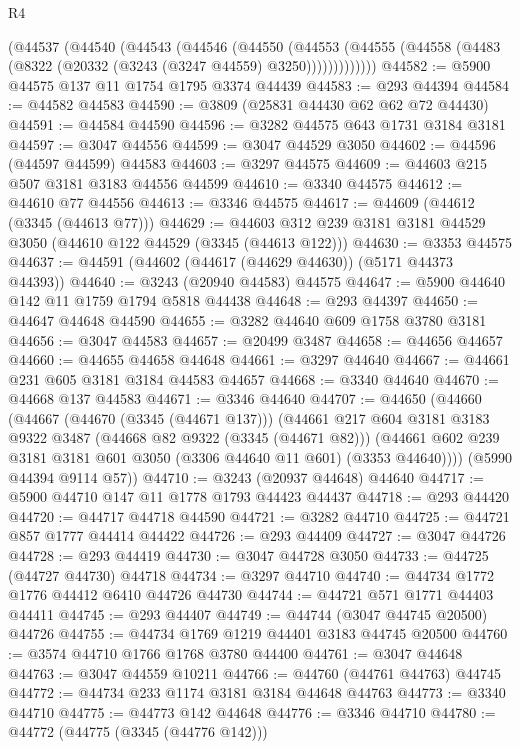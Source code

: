 \begin{lexlean}{R4}
\begin{coremodule}
      (@44537
        (@44540
          (@44543
            (@44546
              (@44550
                (@44553
                  (@44555 (@44558 (@4483 (@8322 (@20332 (@3243 (@3247 @44559) @3250)))))))))))))
@44582 := @5900 @44575 @137 @11 @1754 @1795 @3374 @44439
@44583 := @293 @44394
@44584 := @44582 @44583
@44590 := @3809 (@25831 @44430 @62 @62 @72 @44430)
@44591 := @44584 @44590
@44596 := @3282 @44575 @643 @1731 @3184 @3181
@44597 := @3047 @44556
@44599 := @3047 @44529 @3050
@44602 := @44596 (@44597 @44599) @44583
@44603 := @3297 @44575
@44609 := @44603 @215 @507 @3181 @3183 @44556 @44599
@44610 := @3340 @44575
@44612 := @44610 @77 @44556
@44613 := @3346 @44575
@44617 := @44609 (@44612 (@3345 (@44613 @77)))
@44629 := @44603 @312 @239 @3181 @3181 @44529 @3050 (@44610 @122 @44529 (@3345 (@44613 @122)))
@44630 := @3353 @44575
@44637 := @44591 (@44602 (@44617 (@44629 @44630)) (@5171 @44373 @44393))
@44640 := @3243 (@20940 @44583) @44575
@44647 := @5900 @44640 @142 @11 @1759 @1794 @5818 @44438
@44648 := @293 @44397
@44650 := @44647 @44648 @44590
@44655 := @3282 @44640 @609 @1758 @3780 @3181
@44656 := @3047 @44583
@44657 := @20499 @3487
@44658 := @44656 @44657
@44660 := @44655 @44658 @44648
@44661 := @3297 @44640
@44667 := @44661 @231 @605 @3181 @3184 @44583 @44657
@44668 := @3340 @44640
@44670 := @44668 @137 @44583
@44671 := @3346 @44640
@44707 := @44650
    (@44660
      (@44667
        (@44670 (@3345 (@44671 @137)))
        (@44661
          @217
          @604
          @3181
          @3183
          @9322
          @3487
          (@44668 @82 @9322 (@3345 (@44671 @82)))
          (@44661 @602 @239 @3181 @3181 @601 @3050 (@3306 @44640 @11 @601) (@3353 @44640))))
      (@5990 @44394 @9114 @57))
@44710 := @3243 (@20937 @44648) @44640
@44717 := @5900 @44710 @147 @11 @1778 @1793 @44423 @44437
@44718 := @293 @44420
@44720 := @44717 @44718 @44590
@44721 := @3282 @44710
@44725 := @44721 @857 @1777 @44414 @44422
@44726 := @293 @44409
@44727 := @3047 @44726
@44728 := @293 @44419
@44730 := @3047 @44728 @3050
@44733 := @44725 (@44727 @44730) @44718
@44734 := @3297 @44710
@44740 := @44734 @1772 @1776 @44412 @6410 @44726 @44730
@44744 := @44721 @571 @1771 @44403 @44411
@44745 := @293 @44407
@44749 := @44744 (@3047 @44745 @20500) @44726
@44755 := @44734 @1769 @1219 @44401 @3183 @44745 @20500
@44760 := @3574 @44710 @1766 @1768 @3780 @44400
@44761 := @3047 @44648
@44763 := @3047 @44559 @10211
@44766 := @44760 (@44761 @44763) @44745
@44772 := @44734 @233 @1174 @3181 @3184 @44648 @44763
@44773 := @3340 @44710
@44775 := @44773 @142 @44648
@44776 := @3346 @44710
@44780 := @44772 (@44775 (@3345 (@44776 @142)))

\end{coremodule}
\end{lexlean}
